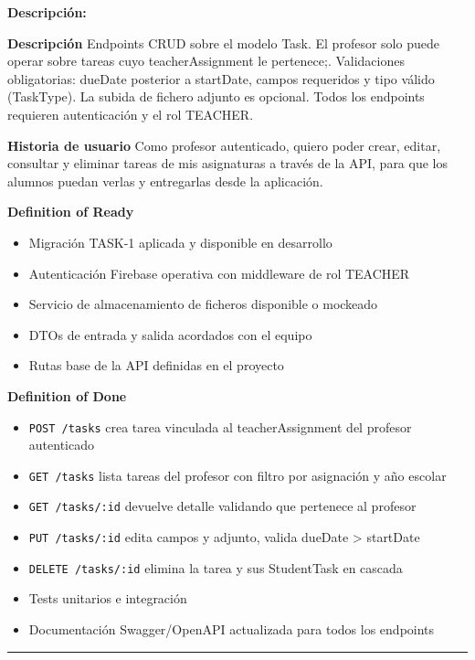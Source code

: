 \documentclass[
  spanish,
  11pt,
]{report}
\providecommand{\tightlist}{%
  \setlength{\itemsep}{0pt}\setlength{\parskip}{0pt}}
\begin{document}
\textbf{Descripción:}

\textbf{Descripción} Endpoints CRUD sobre el modelo Task. El profesor
solo puede operar sobre tareas cuyo teacherAssignment le pertenece;.
Validaciones obligatorias: dueDate posterior a startDate, campos
requeridos y tipo válido (TaskType). La subida de fichero adjunto es
opcional. Todos los endpoints requieren autenticación y el rol TEACHER.

\textbf{Historia de usuario} Como profesor autenticado, quiero poder
crear, editar, consultar y eliminar tareas de mis asignaturas a través
de la API, para que los alumnos puedan verlas y entregarlas desde la
aplicación.

\textbf{Definition of Ready}

\begin{itemize}
\tightlist
\item
  Migración TASK-1 aplicada y disponible en desarrollo
\item
  Autenticación Firebase operativa con middleware de rol TEACHER
\item
  Servicio de almacenamiento de ficheros disponible o mockeado
\item
  DTOs de entrada y salida acordados con el equipo
\item
  Rutas base de la API definidas en el proyecto
\end{itemize}

\textbf{Definition of Done}

\begin{itemize}
\tightlist
\item
  \texttt{POST\ /tasks} crea tarea vinculada al teacherAssignment del
  profesor autenticado
\item
  \texttt{GET\ /tasks} lista tareas del profesor con filtro por
  asignación y año escolar
\item
  \texttt{GET\ /tasks/:id} devuelve detalle validando que pertenece al
  profesor
\item
  \texttt{PUT\ /tasks/:id} edita campos y adjunto, valida dueDate
  \textgreater{} startDate
\item
  \texttt{DELETE\ /tasks/:id} elimina la tarea y sus StudentTask en
  cascada
\item
  Tests unitarios e integración
\item
  Documentación Swagger/OpenAPI actualizada para todos los endpoints
\end{itemize}

\begin{center}\rule{0.5\linewidth}{0.5pt}\end{center}
\end{document}
